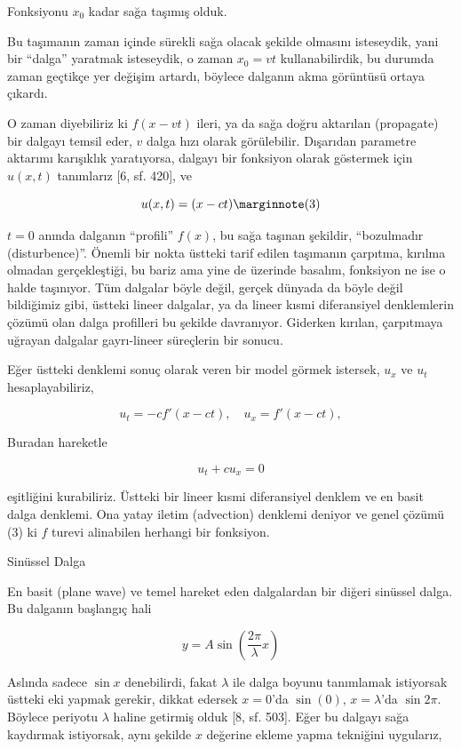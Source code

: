 \documentclass[12pt,fleqn]{article}\usepackage{../../common}
\begin{document}
Fonksiyonu $x_0$ kadar sağa taşımış olduk.

Bu taşımanın zaman içinde sürekli sağa olacak şekilde olmasını isteseydik, yani
bir ``dalga'' yaratmak isteseydik, o zaman $x_0 = v t$ kullanabilirdik, bu
durumda zaman geçtikçe yer değişim artardı, böylece dalganın akma görüntüsü
ortaya çıkardı.

O zaman diyebiliriz ki $f(x-vt)$ ileri, ya da sağa doğru aktarılan (propagate)
bir dalgayı temsil eder, $v$ dalga hızı olarak görülebilir. Dışarıdan parametre
aktarımı karışıklık yaratıyorsa, dalgayı bir fonksiyon olarak göstermek için
$u(x,t)$ tanımlarız [6, sf. 420], ve

$$
u(x,t) = (x - ct)
\mlabel{3}
$$

$t=0$ anında dalganın ``profili'' $f(x)$, bu sağa taşınan şekildir, ``bozulmadır
(disturbence)''. Önemli bir nokta üstteki tarif edilen taşımanın çarpıtma,
kırılma olmadan gerçekleştiği, bu bariz ama yine de üzerinde basalım, fonksiyon
ne ise o halde taşınıyor. Tüm dalgalar böyle değil, gerçek dünyada da böyle
değil bildiğimiz gibi, üstteki lineer dalgalar, ya da lineer kısmi diferansiyel
denklemlerin çözümü olan dalga profilleri bu şekilde davranıyor. Giderken
kırılan, çarpıtmaya uğrayan dalgalar gayrı-lineer süreçlerin bir sonucu.

Eğer üstteki denklemi sonuç olarak veren bir model görmek istersek, $u_x$ ve
$u_t$ hesaplayabiliriz,

$$
u_t = -c f'(x-ct), \quad  u_x = f'(x-ct), 
$$

Buradan hareketle

$$
u_t + c u_x = 0
$$

eşitliğini kurabiliriz. Üstteki bir lineer kısmi diferansiyel denklem ve en
basit dalga denklemi. Ona yatay iletim (advection) denklemi deniyor ve genel
çözümü (3) ki $f$ turevi alinabilen herhangi bir fonksiyon.

Sinüssel Dalga

En basit (plane wave) ve temel hareket eden dalgalardan bir diğeri sinüssel
dalga. Bu dalganın başlangıç hali

$$
y = A \sin \left( \frac{2\pi}{\lambda} x \right)
$$

Aslında sadece $\sin x$ denebilirdi, fakat $\lambda$ ile dalga boyunu tanımlamak
istiyorsak üstteki eki yapmak gerekir, dikkat edersek $x = 0$'da $\sin(0)$,
$x = \lambda$'da  $\sin 2\pi$. Böylece periyotu $\lambda$ haline getirmiş
olduk [8, sf. 503]. Eğer bu dalgayı sağa kaydırmak istiyorsak, aynı şekilde
$x$ değerine ekleme yapma tekniğini uygularız,
\end{document}
